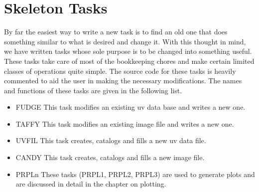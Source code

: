 \chapter{Skeleton Tasks}
\setcounter{page}{1}
 By far the easiest way to write a new task is to find an old one that
does something similar to what is desired and change it.  With this
thought in mind, we have written tasks whose sole purpose is to be
changed into something useful.  These tasks take care of most of the
bookkeeping chores and make certain limited classes of operations
quite simple.  The source code for these tasks is heavily commented to
aid the user in making the necessary modifications.  The names and
functions of these tasks are given in the following list.
\begin{itemize} %
\item FUDGE  This task modifies an existing uv data base and writes a new
one.
\item TAFFY  This task modifies an existing image file and writes a new
one.
\item UVFIL  This task creates, catalogs and fills a new uv data file.
\item CANDY  This task creates, catalogs and fills a new image file.
\item PRPLn These tasks (PRPL1, PRPL2, PRPL3) are used to generate plots
and are discussed in detail in the chapter on plotting.

\end{itemize} %

